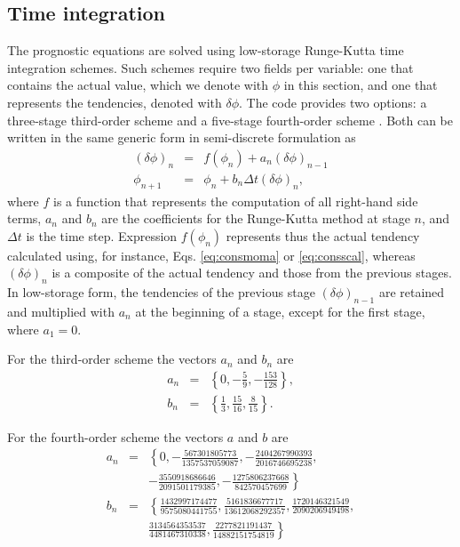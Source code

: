 \documentclass[gmd,manuscript]{copernicus}
\begin{document}
\subsection{Time integration}\label{sec:time_integration}
The prognostic equations are solved using low-storage Runge-Kutta time integration schemes. Such schemes require two fields per variable: one that contains the actual value, which we denote with $\phi$ in this section, and one that represents the tendencies, denoted with $\delta \phi$. The code provides two options: a three-stage third-order scheme \citep{Williamson1980} and a five-stage fourth-order scheme \citep{Carpenter1994}. Both can be written in the same generic form in semi-discrete formulation as
\begin{eqnarray}
\left( \delta \phi \right)_n & = & f \left( \phi_n \right) + a_n \left( \delta \phi \right)_{n-1} \\
\phi_{n+1} & = & \phi_n + b_n \Delta t \left( \delta \phi \right)_{n},
\end{eqnarray}
where $f$ is a function that represents the computation of all right-hand side terms, $a_n$ and $b_n$ are the coefficients for the Runge-Kutta method at stage $n$, and $\Delta t$ is the time step. Expression $f \left( \phi_n \right)$ represents thus the actual tendency calculated using, for instance, Eqs. \ref{eq:consmoma} or \ref{eq:consscal}, whereas $(\delta \phi)_n$ is a composite of the actual tendency and those from the previous stages. In low-storage form, the tendencies of the previous stage $\left( \delta \phi \right)_{n-1}$ are retained and multiplied with $a_n$ at the beginning of a stage, except for the first stage, where $a_1 = 0$. 

For the third-order scheme the vectors $a_n$ and $b_n$ are
\begin{eqnarray}
a_n & = & \left\{0, -\frac{5}{9}, -\frac{153}{128} \right\},\\
b_n & = & \left\{\frac{1}{3}, \frac{15}{16}, \frac{8}{15} \right\}.
\end{eqnarray}

For the fourth-order scheme the vectors $a$ and $b$ are
\begin{eqnarray}
\nonumber a_n & = & \left\{0, -\frac{567301805773}{1357537059087},
-\frac{2404267990393}{2016746695238},\right.\\
& & \left. -\frac{3550918686646}{2091501179385},
-\frac{1275806237668}{842570457699} \right\}\\
\nonumber b_n & = & \left\{\frac{1432997174477}{9575080441755}, \frac{5161836677717}{13612068292357},
\frac{1720146321549}{2090206949498},\right.\\
& & \left. \frac{3134564353537}{4481467310338},
\frac{2277821191437}{14882151754819} \right\}
\end{eqnarray}
\end{document}
